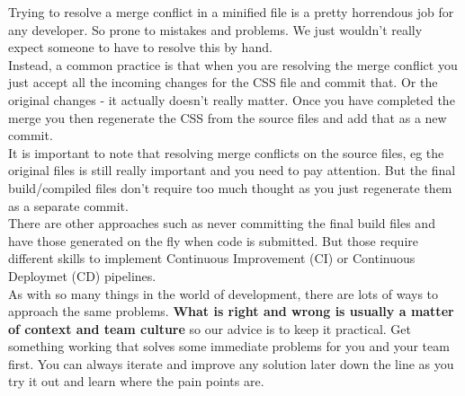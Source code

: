 Trying to resolve a merge conflict in a minified file is a pretty horrendous job for any developer. So prone to mistakes and problems. We just wouldn't really expect someone to have to resolve this by hand.
\\

Instead, a common practice is that when you are resolving the merge conflict you just accept all the incoming changes for the CSS file and commit that. Or the original changes - it actually doesn't really matter. Once you have completed the merge you then regenerate the CSS from the source files and add that as a new commit.
\\

It is important to note that resolving merge conflicts on the source files, eg the original files is still really important and you need to pay attention. But the final build/compiled files don't require too much thought as you just regenerate them as a separate commit.
\\

There are other approaches such as never committing the final build files and have those generated on the fly when code is submitted. But those require different skills to implement Continuous Improvement (CI) or Continuous Deploymet (CD) pipelines.
\\

As with so many things in the world of development, there are lots of ways to approach the same problems. \textbf{What is right and wrong is usually a matter of context and team culture} so our advice is to keep it practical. Get something working that solves some immediate problems for you and your team first. You can always iterate and improve any solution later down the line as you try it out and learn where the pain points are.
\\
